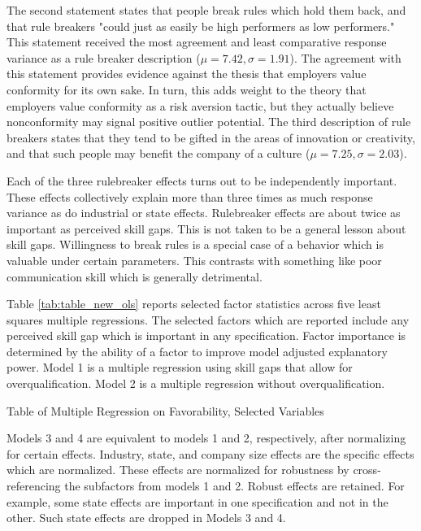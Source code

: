 \documentclass[review]{elsarticle}
\begin{document}
The second statement states that people break rules which hold them back, and that rule breakers "could just as easily be high performers as low performers."
This statement received the most agreement and least comparative response variance as a rule breaker description ($\mu = 7.42, \sigma = 1.91$).
The agreement with this statement provides evidence against the thesis that employers value conformity for its own sake.
In turn, this adds weight to the theory that employers value conformity as a risk aversion tactic, but they actually believe nonconformity may signal positive outlier potential.
The third description of rule breakers states that they tend to be gifted in the areas of innovation or creativity, and that such people may benefit the company of a culture ($\mu = 7.25, \sigma = 2.03$).

Each of the three rulebreaker effects turns out to be independently important.
These effects collectively explain more than three times as much response variance as do industrial or state effects.
Rulebreaker effects are about twice as important as perceived skill gaps.
This is not taken to be a general lesson about skill gaps.
Willingness to break rules is a special case of a behavior which is valuable under certain parameters.
This contrasts with something like poor communication skill which is generally detrimental.

Table \ref{tab:table_new_ols} reports selected factor statistics across five least squares multiple regressions.
The selected factors which are reported include any perceived skill gap which is important in any specification.
Factor importance is determined by the ability of a factor to improve model adjusted explanatory power.
Model 1 is a multiple regression using skill gaps that allow for overqualification.
Model 2 is a multiple regression without overqualification.

\begin{table}
    \caption{Table of Multiple Regression on Favorability, Selected Variables}
    \resizebox{\columnwidth}{!}{
        
    }
    \label{tab:table_new_ols}
\end{table}

Models 3 and 4 are equivalent to models 1 and 2, respectively, after normalizing for certain effects.
Industry, state, and company size effects are the specific effects which are normalized.
These effects are normalized for robustness by cross-referencing the subfactors from models 1 and 2.
Robust effects are retained.
For example, some state effects are important in one specification and not in the other.
Such state effects are dropped in Models 3 and 4.
\end{document}
